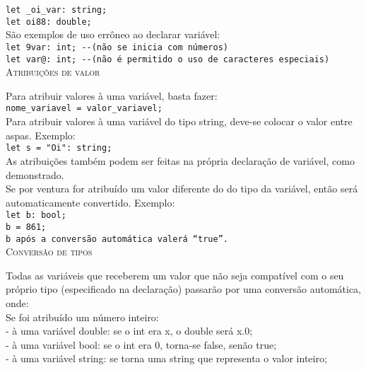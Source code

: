 \documentclass[12pt,a4paper]{article}
\begin{document}
\texttt{\noindent let \_oi\_var: string;\\
\indent let oi88: double;}\\

São exemplos de uso errôneo ao declarar variável:\\

\texttt{\noindent let 9var: int; -{}-(não se inicia com números)\\
\indent let var@: int; -{}-(não é permitido o uso de caracteres especiais)}\\[0.3cm]

\hypertarget{label2}{\Large{\textsc{Atribuições de valor}}}\\
\normalsize

Para atribuir valores à uma variável, basta fazer: \\

\texttt{nome\_variavel = valor\_variavel;}\\

Para atribuir valores à uma variável do tipo string, deve-se colocar o valor entre aspas. Exemplo:\\

\texttt{\noindent let s = "Oi": string;}\\

As atribuições também podem ser feitas na própria declaração de variável, como demonstrado. \\

Se por ventura for atribuído um valor diferente do do tipo da variável, então será automaticamente convertido. Exemplo:\\

\texttt{\noindent let b: bool; \\
\indent b = 861;\\
\indent b após a conversão automática valerá ``true''.}\\[0.3cm]

\hypertarget{label8}{\Large{\textsc{Conversão de tipos}}}\\
\normalsize

Todas as variáveis que receberem um valor que não seja compatível com o seu próprio tipo (especificado na declaração) passarão por uma conversão automática, onde: \\

Se foi atribuído um número inteiro:\\[0.15cm]
- à uma variável double: se o int era x, o double será x.0;\\
- à uma variável bool: se o int era 0, torna-se false, senão true;\\
- à uma variável string: se torna uma string que representa o valor inteiro;\\[0.3cm]
\end{document}
